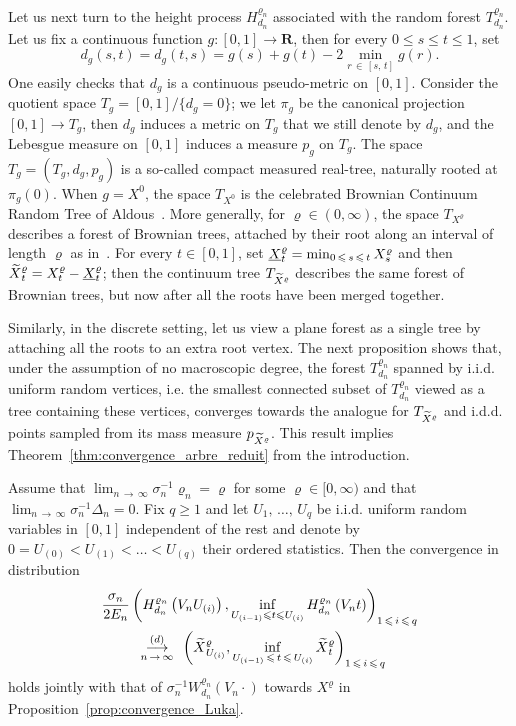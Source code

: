 \documentclass[AHL,Unicode,longabstracts,published]{cedram}
\newcommand{\ensembles}[1]{\mathbf{#1}}
\newcommand{\R}{\ensembles{R}}
\newcommand{\1}{\ensembles{1}}
\newcommand{\tildep}[1]{\widetilde{#1}\vphantom{#1}}
\newcommand{\underlinep}[1]{\underline{#1}\vphantom{#1}}
\renewcommand{\le}{\leqslant}
\renewcommand{\ge}{\geqslant}
\newcommand{\CRT}{T}
\newcommand{\dCRT}{d}
\newcommand{\pCRT}{p}
\newcommand{\fn}{T_{d_n}^{\varrho_n}}
\newcommand{\Wfn}{W_{d_n}^{\varrho_n}}
\newcommand{\Hfn}{H_{d_n}^{\varrho_n}}
\newcommand{\tX}{\tildep{X}^{\varrho}}
\newcommand{\edges}{E}
\newcommand{\vertices}{V}
\newcommand{\cvloi}[1][n]{\enskip\mathop{\longrightarrow}^{(d)}_{#1\,\to\, \infty}\enskip}
\begin{document}
Let us next turn to the height process $\Hfn$ associated with the random forest $\fn$. Let us fix a continuous function $g : [0,1] \to \R$, then for every $0 \le s \le t \le 1$, set
\[
\dCRT_g(s,t) = \dCRT_g(t,s) = g(s) + g(t) - 2 \min_{r\,\in\,[s,\,t]} g(r).
\]
One easily checks that $\dCRT_g$ is a continuous pseudo-metric on $[0,1]$. Consider the quotient space $\CRT_g = [0,1] / \{\dCRT_g = 0\}$; we let $\pi_g$ be the canonical projection $[0,1] \to \CRT_g$, then $\dCRT_g$ induces a metric on $\CRT_g$ that we still denote by $\dCRT_g$, and the Lebesgue measure on $[0,1]$ induces a measure $\pCRT_g$ on $\CRT_g$. The space $\CRT_g = (\CRT_g, \dCRT_g, \pCRT_g)$ is a so-called compact measured real-tree, naturally rooted at $\pi_g(0)$. When $g = X^0$, the space $\CRT_{X^0}$ is the celebrated Brownian Continuum Random Tree of Aldous~\cite{Ald93}. More generally, for $\varrho \in (0,\infty)$, the space $\CRT_{X^\varrho}$ describes a forest of Brownian trees, attached by their root along an interval of length $\varrho$ as in~\cite{BM17}. For every $t \in [0,1]$, set $\underlinep{X}^\varrho_t = \min_{0\,\le\,s\, \le\,t} X^\varrho_s$ and then $\tX_t = X^\varrho_t-\underlinep{X}^\varrho_t$; then the continuum tree $\CRT_{\tX}$ describes the same forest of Brownian trees, but now after all the roots have been merged together.

Similarly, in the discrete setting, let us view a plane forest as a single tree by attaching all the roots to an extra root vertex. The next proposition shows that, under the assumption of no macroscopic degree, the forest $\fn$ spanned by i.i.d. uniform random vertices, i.e. the smallest connected subset of $\fn$ viewed as a tree containing these vertices, converges towards the analogue for $\CRT_{\tX}$ and i.d.d. points sampled from its mass measure $\pCRT_{\tX}$. This result implies Theorem~\ref{thm:convergence_arbre_reduit} from the introduction.


\begin{theo}\label{thm:marginales_hauteur}
Assume that $\lim_{n\,\to\,\infty} \sigma_n^{-1} \varrho_n = \varrho$ for some $\varrho \in [0,\infty)$ and that $\lim_{n\,\to\,\infty} \sigma_n^{-1} \Delta_n = 0$. Fix $q \ge 1$ and let $U_1,\,\dots,\,U_q$ be i.i.d. uniform random variables in $[0,1]$ independent of the rest and denote by $0 = U_{(0)} < U_{(1)} < \dots < U_{(q)}$ their ordered statistics. Then the convergence in distribution
\begin{multline*}
\frac{\sigma_n}{2 \edges_n} \left(\Hfn\left(\vertices_n U_{(i)}\right), \inf_{U_{(i-1)} \le t \le U_{(i)}} \Hfn\left(\vertices_n t\right)\right)_{1\,\le\,i\,\le\,q}\\
\cvloi
\left(\tX_{U_{(i)}}, \inf_{U_{(i-1)}\,\le\,t \,\le\,U_{(i)}} \tX_t\right)_{1\,\le\,i\,\le\,q}
\end{multline*}
holds jointly with that of $\sigma_n^{-1} \Wfn(\vertices_n \cdot)$ towards $X^\varrho$ in Proposition~\ref{prop:convergence_Luka}.
\end{theo}
\end{document}
